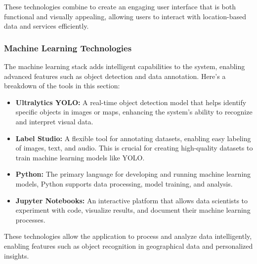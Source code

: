 These technologies combine to create an engaging user interface that is both functional and visually appealing, allowing users to interact with location{-}based data and services efficiently.

\subsubsection{Machine Learning Technologies}

The machine learning stack adds intelligent capabilities to the system, enabling advanced features such as object detection and data annotation. Here’s a breakdown of the tools in this section:

\begin{itemize}
    \item{} \textbf{Ultralytics YOLO:} A real-time object detection model that helps identify specific objects in images or maps, enhancing the system's ability to recognize and interpret visual data.
    \item{} \textbf{Label Studio:} A flexible tool for annotating datasets, enabling easy labeling of images, text, and audio. This is crucial for creating high-quality datasets to train machine learning models like YOLO.
    \item{} \textbf{Python:} The primary language for developing and running machine learning models, Python supports data processing, model training, and analysis.
    \item{} \textbf{Jupyter Notebooks:} An interactive platform that allows data scientists to experiment with code, visualize results, and document their machine learning processes.
\end{itemize}

These technologies allow the application to process and analyze data intelligently, enabling features such as object recognition in geographical data and personalized insights.